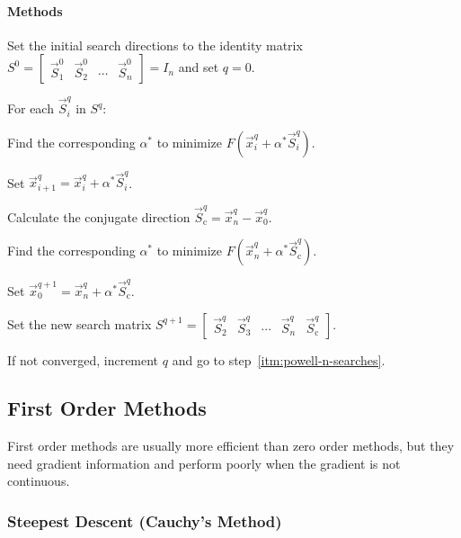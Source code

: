 \documentclass{article}
\begin{document}
\paragraph{Methods}
\begin{enumerate*}
\item Set the initial search directions to the identity matrix
  \(S^0
  = \begin{bmatrix}\vec{S}^0_1 & \vec{S}^0_2 & \cdots & \vec{S}^0_n\end{bmatrix}
  = I_n\) and set \(q = 0\).
\item \label{itm:powell-n-searches} For each \(\vec{S}^q_i\) in \(S^q\):
  \begin{enumerate*}
  \item Find the corresponding \(\alpha^*\) to minimize \(F(\vec{x}^q_i + \alpha^* \vec{S}^q_i)\).
  \item Set \(\vec{x}^q_{i+1} = \vec{x}^q_i + \alpha^* \vec{S}^q_i\).
  \end{enumerate*}
\item Calculate the conjugate direction \(\vec{S}^q_\mathrm{c} = \vec{x}^q_n - \vec{x}^q_0\).
\item Find the corresponding \(\alpha^*\) to minimize \(F(\vec{x}^q_n + \alpha^*
  \vec{S}^q_\mathrm{c})\).
\item Set \(\vec{x}^{q+1}_0 = \vec{x}^q_n + \alpha^* \vec{S}^q_\mathrm{c}\).
\item Set the new search matrix \(S^{q+1} =
\begin{bmatrix}
\vec{S}^q_2 & \vec{S}^q_3 & \cdots & \vec{S}^q_n & \vec{S}^q_\mathrm{c}
\end{bmatrix}\).
\item If not converged, increment \(q\) and go to step~\ref{itm:powell-n-searches}.
\end{enumerate*}

\subsection{First Order Methods}

First order methods are usually more efficient than zero order methods, but they need gradient
information and perform poorly when the gradient is not continuous.

\subsubsection{Steepest Descent (Cauchy's Method)}
\end{document}
